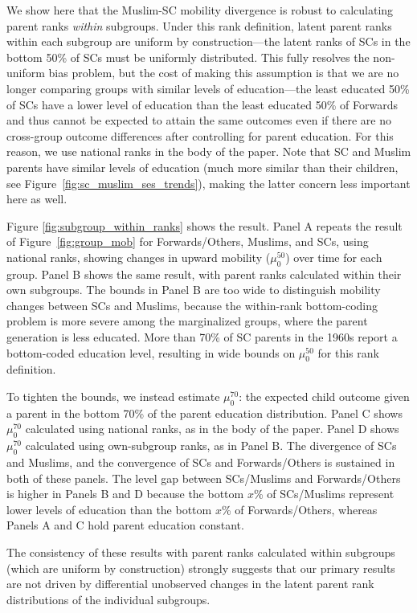 We show here that the Muslim-SC mobility divergence is robust to calculating parent ranks \textit{within} subgroups. Under this rank definition, latent parent ranks within each subgroup are uniform by construction---the latent ranks of SCs in the bottom 50\% of SCs must be uniformly distributed. This fully resolves the non-uniform bias problem, but the cost of making this assumption is that we are no longer comparing groups with similar levels of education---the least educated 50\% of SCs have a lower level of education than the least educated 50\% of Forwards and thus cannot be expected to attain the same outcomes even if there are no cross-group outcome differences after controlling for parent education. For this reason, we use national ranks in the body of the paper. Note that SC and Muslim parents have similar levels of education (much more similar than their children, see Figure~\ref{fig:sc_muslim_ses_trends}), making the latter concern less important here as well.

Figure \ref{fig:subgroup_within_ranks} shows the result. Panel A repeats the result of Figure~\ref{fig:group_mob} for Forwards/Others, Muslims, and SCs, using national ranks, showing changes in upward mobility ($\mu_0^{50}$) over time for each group. Panel B shows the same result, with parent ranks calculated within their own subgroups. The bounds in Panel B are too wide to distinguish mobility changes between SCs and Muslims, because the within-rank bottom-coding problem is more severe among the marginalized groups, where the parent generation is less educated. More than 70\% of SC parents in the 1960s report a bottom-coded education level, resulting in wide bounds on $\mu_0^{50}$ for this rank definition. 

To tighten the bounds, we instead estimate $\mu_0^{70}$: the expected child outcome given a parent in the bottom 70\% of the parent education distribution. Panel C shows $\mu_0^{70}$ calculated using national ranks, as in the body of the paper. Panel D shows $\mu_0^{70}$ calculated using own-subgroup ranks, as in Panel B. The divergence of SCs and Muslims, and the convergence of SCs and Forwards/Others is sustained in both of these panels. The level gap between SCs/Muslims and Forwards/Others is higher in Panels B and D because the bottom $x$\% of SCs/Muslims represent lower levels of education than the bottom $x$\% of Forwards/Others, whereas Panels A and C hold parent education constant.

The consistency of these results with parent ranks calculated within subgroups (which are uniform by construction) strongly suggests that our primary results are not driven by differential unobserved changes in the latent parent rank distributions of the individual subgroups.


